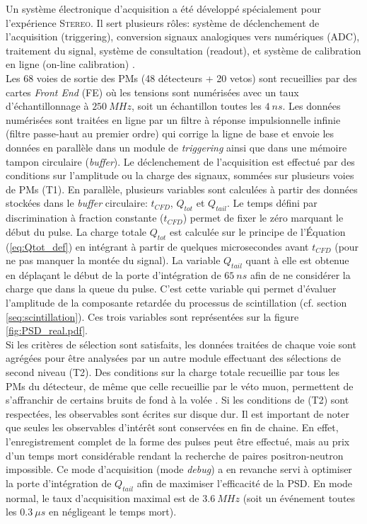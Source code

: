 Un système électronique d'acquisition a été développé spécialement pour l'expérience \textsc{Stereo}. Il sert plusieurs rôles: système de déclenchement de l'acquisition (triggering), conversion signaux analogiques vers numériques (ADC), traitement du signal, système de consultation (readout), et système de calibration en ligne (on-line calibration) \cite{Bourrion:2015axa}.\\ 

Les 68 voies de sortie des PMs (48 détecteurs + 20 vetos) sont recueillies par des cartes \textit{Front End} (FE) où les tensions sont numérisées avec un taux d'échantillonnage à $\SI{250}{MHz}$, soit un échantillon toutes les $\SI{4}{ns}$. Les données numérisées sont traitées en ligne par un filtre à réponse impulsionnelle infinie (filtre passe-haut au premier ordre) qui corrige la ligne de base et envoie les données en parallèle dans un module de \textit{triggering} ainsi que dans une mémoire tampon circulaire (\textit{buffer}). Le déclenchement de l'acquisition est effectué par des conditions sur l'amplitude ou la charge des signaux, sommées sur plusieurs voies de PMs (T1). En parallèle, plusieurs variables sont calculées à partir des données stockées dans le \textit{buffer} circulaire: $t_{CFD}$, $Q_{tot}$ et $Q_{tail}$. Le temps défini par discrimination à fraction constante ($t_{CFD}$) permet de fixer le zéro marquant le début du pulse. La charge totale $Q_{tot}$ est calculée sur le principe de l'Équation (\ref{eq:Qtot_def}) en intégrant à partir de quelques microsecondes avant $t_{CFD}$ (pour ne pas manquer la montée du signal). La variable $Q_{tail}$ quant à elle est obtenue en déplaçant le début de la porte d'intégration de $\SI{65}{ns}$ \cite{docdb409} afin de ne considérer la charge que dans la queue du pulse. C'est cette variable qui permet d'évaluer l'amplitude de la composante retardée du processus de scintillation (cf. section \ref{seq:scintillation}). Ces trois variables sont représentées sur la figure \ref{fig:PSD_real.pdf}.\\ 

Si les critères de sélection sont satisfaits, les données traitées de chaque voie sont agrégées pour être analysées par un autre module effectuant des sélections de second niveau (T2). Des conditions sur la charge totale recueillie par tous les PMs du détecteur, de même que celle recueillie par le véto muon, permettent de s'affranchir de certains bruits de fond à la volée \cite{docdb179}. Si les conditions de (T2) sont respectées, les observables sont écrites sur disque dur. Il est important de noter que seules les observables d'intérêt sont conservées en fin de chaine. En effet, l'enregistrement complet de la forme des pulses peut être effectué, mais au prix d'un temps mort considérable rendant la recherche de paires positron-neutron impossible. Ce mode d'acquisition (mode \textit{debug}) a en revanche servi à optimiser la porte d'intégration de $Q_{tail}$ afin de maximiser l'efficacité de la PSD. En mode normal, le taux d'acquisition maximal est de $\SI{3.6}{MHz}$ (soit un événement toutes les $\SI{0.3}{\mu s}$ en négligeant le temps mort).\\ 

